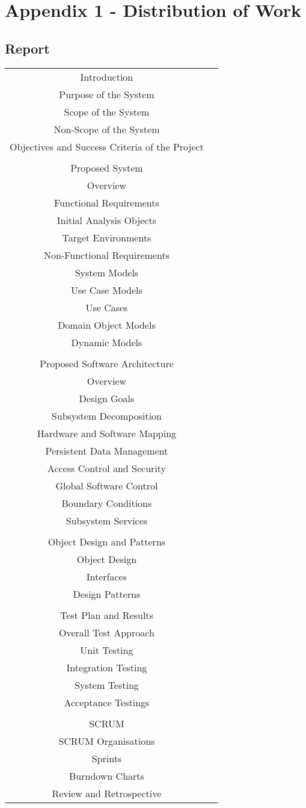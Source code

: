 \section{Appendix 1 - Distribution of Work}
\subsection{Report}
\begin{tabular}{*{2}{|c|}}
	Introduction &\\
	Purpose of the System & \\
	Scope of the System &\\
	Non-Scope of the System&\\
	Objectives and Success Criteria of the Project &\\
	\hline&\\
	\hline
	Proposed System&\\
	Overview&\\
	Functional Requirements&\\
	Initial Analysis Objects&\\
	Target Environments&\\
	Non-Functional Requirements&\\
	\hline
	System Models&\\
	Use Case Models&\\
	Use Cases&\\
	Domain Object Models&\\
	Dynamic Models&\\
	\hline&\\
	\hline
	Proposed Software Architecture&\\
	Overview&\\
	Design Goals&\\
	Subsystem Decomposition&\\
	Hardware and Software Mapping&\\
	Persistent Data Management&\\
	Access Control and Security&\\
	Global Software Control&\\
	Boundary Conditions&\\
	\hline
	Subsystem Services&\\
	\hline&\\
	\hline
	Object Design and Patterns&\\
	Object Design&\\
	Interfaces&\\
	Design Patterns&\\
	\hline&\\
	\hline
	Test Plan and Results&\\
	Overall Test Approach&\\
	Unit Testing&\\
	Integration Testing&\\
	System Testing&\\
	Acceptance Testings&\\
	\hline&\\
	\hline
	SCRUM&\\
	SCRUM Organisations&\\
	Sprints&\\
	Burndown Charts&\\
	Review and Retrospective&\\
	\hline
\end{tabular}